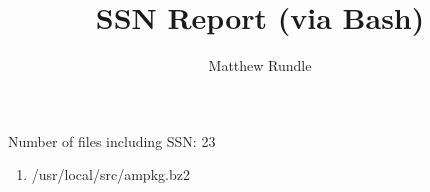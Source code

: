 \documentclass{article}
\title{SSN Report (via Bash)}
\author{Matthew Rundle}
\begin{document}
\maketitle
Number of files including SSN: 23
\begin{enumerate}
\item /usr/local/src/ampkg.bz2
\end{enumerate}
\end{document}
